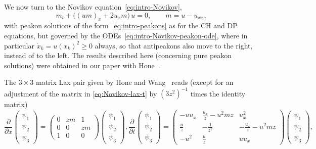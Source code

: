 \documentclass[10pt,a4paper]{article} \pdfoutput=1 
\begin{document}
We now turn to the Novikov equation~\eqref{eq:intro-Novikov},
\begin{equation*}
  m_t + \bigl( (u m)_x + 2 u_x m \bigr) \, u = 0
  ,\qquad
  m = u - u_{xx}
  ,
\end{equation*}
with peakon solutions of the form~\eqref{eq:intro-peakons}
as for the CH and DP equations, but
governed by the ODEs~\eqref{eq:intro-Novikov-peakon-ode},
where in particular $\dot x_k = u(x_k)^2 \ge 0$ always,
so that antipeakons also move to the right, instead of to the left.
The results described here
(concerning pure peakon solutions)
were obtained in our paper with Hone~\cite{hone-lundmark-szmigielski:2009:novikov}.

The $3 \times 3$ matrix Lax pair given by Hone and Wang~\cite{hone-wang:2008:cubic-nonlinearity}
reads
(except for an adjustment of the matrix in \eqref{eq:Novikov-lax-t} by $(3 z^2)^{-1}$ times the identity matrix)
\begin{subequations}
  \label{eq:Novikov-lax}
  \begin{equation}
    \label{eq:Novikov-lax-x}
    \frac{\partial}{\partial x}
    \begin{pmatrix} \psi_1 \\ \psi_2 \\ \psi_3 \end{pmatrix} =
    \begin{pmatrix}
      0 & zm & 1 \\
      0 & 0 & zm \\
      1 & 0 & 0
    \end{pmatrix}
    \begin{pmatrix} \psi_1 \\ \psi_2 \\ \psi_3 \end{pmatrix}
    ,
  \end{equation}
  \begin{equation}
    \label{eq:Novikov-lax-t}
    \frac{\partial}{\partial t}
    \begin{pmatrix} \psi_1 \\ \psi_2 \\ \psi_3 \end{pmatrix} =
    \begin{pmatrix}
      -u u_x & \frac{u_x}{z}-u^2 mz & u_x^2 \\
      \frac{u}{z} & - \frac{1}{z^2} & - \frac{u_x}{z} - u^2 mz \\
      -u^2 & \frac{u}{z} & uu_x
    \end{pmatrix}
    \begin{pmatrix} \psi_1 \\ \psi_2 \\ \psi_3 \end{pmatrix}
    ,
  \end{equation}
\end{subequations}
\end{document}
